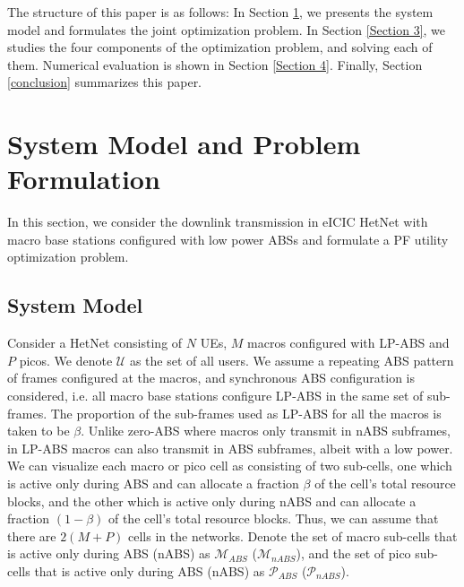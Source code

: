 \documentclass[journal]{IEEETran}
\begin{document}
The structure of this paper is as follows: In Section \ref{Section 2}, we presents the system model and formulates the joint optimization problem. In Section \ref{Section 3}, we studies the four components of the optimization problem, and solving each of them. Numerical evaluation is shown in Section \ref{Section 4}. Finally, Section \ref{conclusion} summarizes this paper.


\section{System  Model and Problem Formulation}\label{Section 2}
  In this section, we consider the downlink transmission in eICIC HetNet with macro base stations configured with low power ABSs and formulate a PF utility optimization problem.

\subsection{System Model}\label{System model}
Consider a HetNet consisting of $N$ UEs, $M$ macros configured with LP-ABS and $P$ picos. We denote $\mathcal{U}$ as the set of all users.
We assume a repeating ABS pattern of frames configured at the macros, and synchronous ABS configuration is considered, i.e. all macro base stations configure LP-ABS in the same set of sub-frames. The proportion of the sub-frames used as LP-ABS for all the macros is taken to be $\beta$. Unlike zero-ABS where macros only transmit in nABS subframes, in LP-ABS macros can also transmit in ABS subframes, albeit with a low power. We can visualize each macro or pico cell as consisting of two sub-cells, one which is active only during ABS and can allocate a fraction $\beta$ of the cell's total resource blocks, and the other which is active only during nABS and can allocate a fraction $(1 - \beta)$ of the cell's total resource blocks. Thus, we can assume that there are $2(M + P)$ cells in the networks. Denote the set of macro sub-cells that is active only during ABS (nABS) as $\mathcal{M}_{ABS}$ ($\mathcal{M}_{nABS}$), and the set of pico sub-cells that is active only during ABS (nABS) as $\mathcal{P}_{ABS}$ ($\mathcal{P}_{nABS}$).
\end{document}
